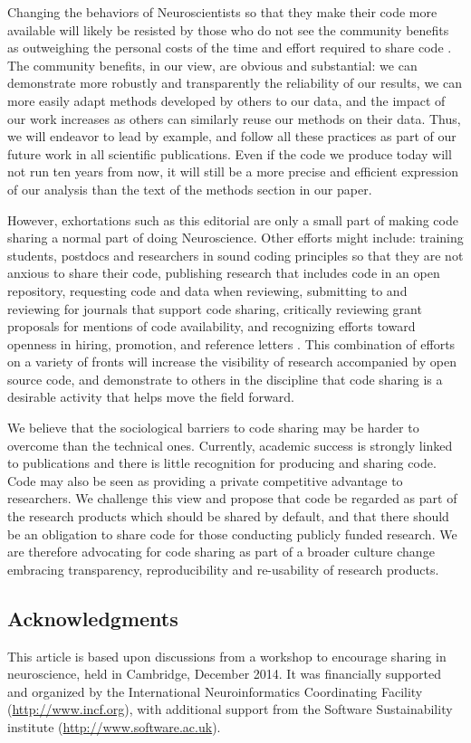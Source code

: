 \documentclass[11pt]{article}
\begin{document}
Changing the behaviors of Neuroscientists so that they make their code more available will likely be resisted by those who do not see the community benefits as outweighing the personal costs of the time and effort required to share code \cite{stodden2010scientific}. The community benefits, in our view, are obvious and substantial: we can demonstrate more robustly and transparently the reliability of our results, we can more easily adapt methods developed by others to our data, and the impact of our work increases as others can similarly reuse our methods on their data. Thus, we will endeavor to lead by example, and follow all these practices as part of our future work in all scientific publications. Even if the code we produce today will not run ten years from now, it will still be a more precise and efficient expression of our analysis than the text of the methods section in our paper. 

However, exhortations such as this editorial are only a small part of making code sharing a normal part of doing Neuroscience. Other efforts might include: training students,  postdocs and researchers in sound coding principles so that they are not anxious to share their code, publishing research that includes code in an open repository, requesting code and data when reviewing, submitting to and reviewing for journals that support code sharing, critically reviewing grant proposals
 for mentions of code availability, and recognizing efforts toward openness in hiring, promotion, and reference letters \cite{leveque2012reproducible}. This combination of efforts on a variety of fronts will increase the visibility of research accompanied by open source code, and demonstrate to others in the discipline that code sharing is a desirable activity that helps move the field forward. 

We believe that the sociological barriers to code sharing may be harder to overcome than the technical ones. Currently, academic success is strongly linked to publications and there is little recognition for producing and sharing code. Code may also be seen as providing a private competitive advantage to researchers. We challenge this view and propose that code be regarded as part of the research products which should be shared by default, and that there should be an obligation to share code for those conducting publicly funded research. We are therefore advocating for code sharing as part of a broader culture change embracing transparency, reproducibility and re-usability of research products.   

\subsection*{Acknowledgments}

This article is based upon discussions from a workshop to encourage
sharing in neuroscience, held in Cambridge, December 2014.  It was
financially supported and organized by the International
Neuroinformatics Coordinating Facility (\url{http://www.incf.org}),
with additional support from the Software Sustainability institute
(\url{http://www.software.ac.uk}).


\printbibliography
\end{document}
